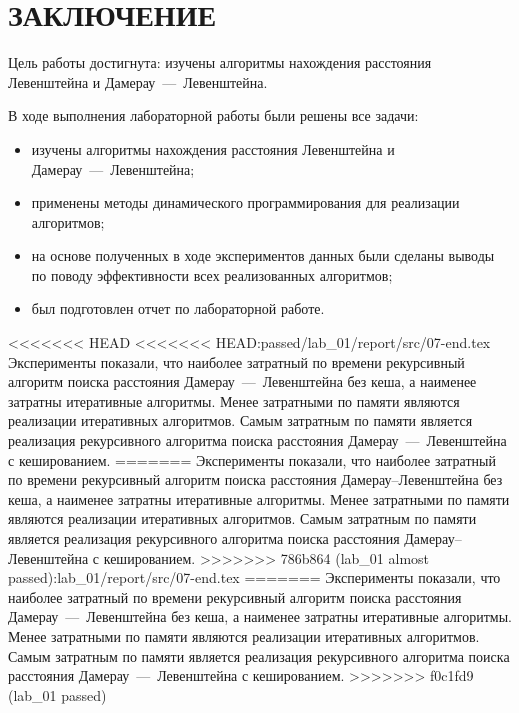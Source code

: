 \section*{ЗАКЛЮЧЕНИЕ}

Цель работы достигнута: изучены алгоритмы нахождения расстояния Левенштейна и Дамерау~---~Левенштейна.

В ходе выполнения лабораторной работы были решены все задачи:
\begin{itemize}
	\item изучены алгоритмы нахождения расстояния Левенштейна и Дамерау~---~Левенштейна;
	\item применены методы динамического программирования для реализации алгоритмов;
	\item на основе полученных в ходе экспериментов данных были сделаны выводы по поводу эффективности всех реализованных алгоритмов;
	\item был подготовлен отчет по лабораторной работе.
\end{itemize}

<<<<<<< HEAD
<<<<<<< HEAD:passed/lab_01/report/src/07-end.tex
Эксперименты показали, что наиболее затратный по времени рекурсивный алгоритм поиска расстояния Дамерау~---~Левенштейна без кеша, а наименее затратны итеративные алгоритмы. Менее затратными по памяти являются реализации итеративных алгоритмов. 
Самым затратным по памяти является реализация рекурсивного алгоритма поиска расстояния Дамерау~---~Левенштейна с кешированием. 
=======
Эксперименты показали, что наиболее затратный по времени рекурсивный алгоритм поиска расстояния Дамерау--Левенштейна без кеша, а наименее затратны итеративные алгоритмы. Менее затратными по памяти являются реализации итеративных алгоритмов. 
Самым затратным по памяти является реализация рекурсивного алгоритма поиска расстояния Дамерау--Левенштейна с кешированием. 
>>>>>>> 786b864 (lab_01 almost passed):lab_01/report/src/07-end.tex
=======
Эксперименты показали, что наиболее затратный по времени рекурсивный алгоритм поиска расстояния Дамерау~---~Левенштейна без кеша, а наименее затратны итеративные алгоритмы. Менее затратными по памяти являются реализации итеративных алгоритмов. 
Самым затратным по памяти является реализация рекурсивного алгоритма поиска расстояния Дамерау~---~Левенштейна с кешированием. 
>>>>>>> f0c1fd9 (lab_01 passed)
